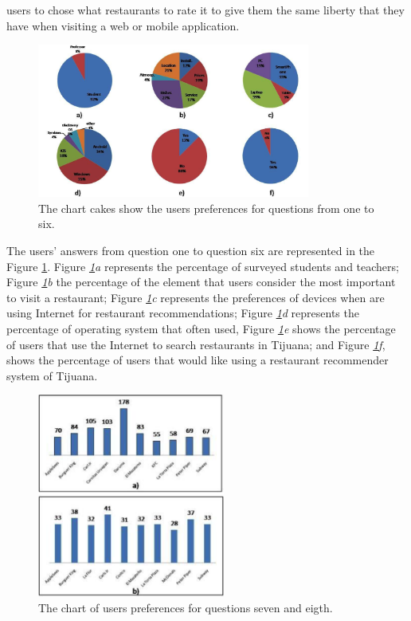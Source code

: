 users to chose what restaurants to rate it to give them the same liberty
that they have when visiting a web or mobile application. 
\begin{figure}
\captionsetup{justification=centering,margin=2cm,font=footnotesize}
\centering
\setlength\fboxsep{0pt}
\includegraphics[width=0.8\textwidth]{img/cakes.png}
\caption{The chart cakes show the users preferences for questions from one to six.}
\label{fig:cakeschart}     
\end{figure}
The users' answers from question one to question six are represented in
the Figure  \ref{fig:cakeschart}. Figure  \textit{\ref{fig:cakeschart}a}
represents the percentage of surveyed students and teachers;
Figure  \textit{\ref{fig:cakeschart}b}  the percentage of the element
that users consider the most important to visit a restaurant;
Figure  \textit{\ref{fig:cakeschart}c} represents the preferences of
devices when are using Internet for restaurant recommendations;
Figure  \textit{\ref{fig:cakeschart}d} represents the percentage of
operating system that often used, 
Figure  \textit{\ref{fig:cakeschart}e} shows the percentage of users 
that use the Internet to search restaurants in Tijuana; and 
Figure  \textit{\ref{fig:cakeschart}f}, shows the percentage of users 
that would like using a restaurant recommender system of Tijuana.
\begin{figure}
\captionsetup{justification=centering,margin=2cm,font=footnotesize}
\centering
\setlength\fboxsep{0pt}
\includegraphics[width=0.55\textwidth]{img/bars.png}
\caption{The chart of users preferences for questions seven and eigth.}
\label{fig:barschart}     
\end{figure}
